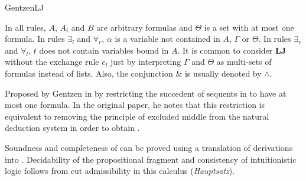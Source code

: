 \begin{entry}{GentzenLJ}
\begin{clarifications}
In all rules, $A$, $A_i$ and $B$ are arbitrary formulas and $\Theta$ is a set
with at most one formula. In rules $\exists_l$
and $\forall_r$, $\alpha$ is a variable not contained in $A$, $\Gamma$ or
$\Theta$. In rules $\exists_r$ and $\forall_l$, $t$ does not contain variables
bound in $A$.
It is common to consider \textbf{LJ} without the exchange rule $e_l$ just by
interpreting $\Gamma$ and $\Theta$ as multi-sets of formulas instead of lists.
Also, the conjunction $\&$ is usually denoted by $\wedge$.
\end{clarifications}

\begin{history}
Proposed by Gentzen in \cite{Gentzen1935} by restricting the
succedent of sequents in  to have at most one
formula. In the original paper, he notes that this restriction is equivalent to
removing the principle of excluded middle from the natural deduction system
 in order to obtain .
\end{history}

\begin{technicalities}
Soundness and completeness of \LJ can be proved using a translation of \LJ
derivations into \NJ{}.
Decidability of the propositional fragment and consistency of intuitionistic
logic follows from cut admissibility in this calculus (\emph{Hauptsatz}).
\end{technicalities}







\end{entry}

